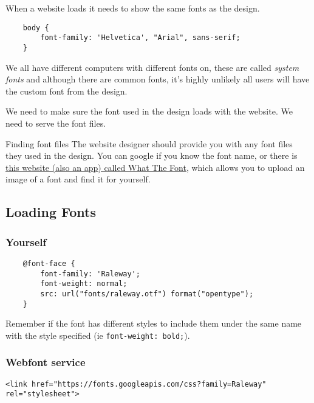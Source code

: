 When a website loads it needs to show the same fonts as the design.

\begin{verbatim}
    body {
        font-family: 'Helvetica', "Arial", sans-serif;
    }
\end{verbatim}

We all have different computers with different fonts on, these are called \textit{system fonts} and although there are common fonts, it's highly unlikely all users will have the custom font from the design.

We need to make sure the font used in the design loads with the website. We need to serve the font files.

\begin{infobox}{Finding font files}
    The website designer should provide you with any font files they used in the design. You can google if you know the font name, or there is \href{https://www.myfonts.com/WhatTheFont}{this website (also an app) called What The Font}, which allows you to upload an image of a font and find it for yourself.
\end{infobox}

\subsection{Loading Fonts}

\subsubsection{Yourself}

\begin{verbatim}
    @font-face {
        font-family: 'Raleway';
        font-weight: normal;
        src: url("fonts/raleway.otf") format("opentype");
    }
\end{verbatim}

Remember if the font has different styles to include them under the same name with the style specified (ie \texttt{font-weight: bold;}).

\subsubsection{Webfont service}

\begin{verbatim}
<link href="https://fonts.googleapis.com/css?family=Raleway" rel="stylesheet">
\end{verbatim}

